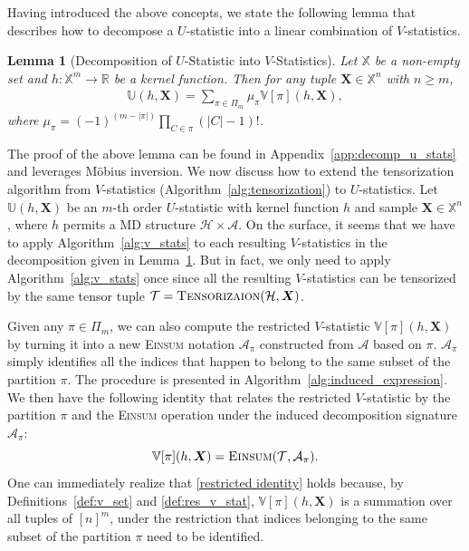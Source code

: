 \documentclass[sn-mathphys, natbib=false]{sn-jnl}
\theoremstyle{plain}
\newtheorem{lemma}{Lemma}
\theoremstyle{definition}
\def\Einsum{\textsc{Einsum}}
\newcommand{\mobius}{M\"obius}
\newcommand{\sPi}{\pi}
\newcommand{\ustat}{\mathbb{U}}
\newcommand{\vstat}{\mathbb{V}}
\newcommand{\ustatp}[2]{\ustat(#1,#2)}
\newcommand{\samplespace}{\bbX}
\newcommand{\partition}{\Pi}
\newcommand{\partitionp}[1]{\partition_{#1}}
\newcommand{\tensorcontraction}{\textsc{Einsum}}
\newcommand{\bbR}{{\mathbb{R}}}
\def\bbX{\mathbb{X}}
\def\calA{\mathcal{A}}
\def\calT{\mathcal{T}}
\def\calH{\mathcal{H}}
\begin{document}
\begin{bibunit}[agsm]
Having introduced the above concepts, we state the following lemma that describes how to decompose a $U$-statistic into a linear combination of $V$-statistics.

\begin{lemma}[Decomposition of $U$-Statistic into $V$-Statistics]
\label{lem:decomp_u_to_v}
Let $\bbX$ be a non-empty set and $h: \bbX^{m} \rightarrow \bbR$ be a kernel function. Then for any tuple $\bm{X} \in \bbX^{n}$ with $n \geq m$,
\begin{align*}
    \ustat(h,\bm{X}) = \sum_{\sPi \in \partitionp{m}} 
    \mu_\sPi \vstat[\sPi](h, \bm{X}), 
\end{align*}
where $\mu_\sPi = (-1)^{(m-|\sPi|)} \prod_{C \in \sPi} (|C| - 1)!$.
\end{lemma}

The proof of the above lemma can be found in Appendix~\ref{app:decomp_u_stats} and leverages \mobius{} inversion. We now discuss how to extend the tensorization algorithm from $V$-statistics (Algorithm~\ref{alg:tensorization}) to $U$-statistics. Let $\ustatp{h}{\bm{X}}$ be an $m$-th order $U$-statistic with kernel function $h$ and sample $\bm{X} \in \samplespace^n$, where $h$ permits a MD structure $\calH \times \calA$. On the surface, it seems that we have to apply Algorithm~\ref{alg:v_stats} to each resulting $V$-statistics in the decomposition given in Lemma~\ref{lem:decomp_u_to_v}. But in fact, we only need to apply Algorithm~\ref{alg:v_stats} once since all the resulting $V$-statistics can be tensorized by the same tensor tuple $\calT = \textsc{Tensorizaion} (\calH, \bm{X})$. 

Given any $\pi \in \partitionp{m}$, we can also compute the restricted $V$-statistic $\vstat[\pi] (h, \bm{X})$ by turning it into a new \Einsum{} notation $\calA_{\pi}$ constructed from $\calA$ based on $\pi$. $\calA_{\pi}$ simply identifies all the indices that happen to belong to the same subset of the partition $\pi$. The procedure is presented in Algorithm~\ref{alg:induced_expression}. We then have the following identity that relates the restricted $V$-statistic by the partition $\sPi$ and the \Einsum{} operation under the induced decomposition signature $\calA_{\pi}$:
\begin{equation}
\label{restricted identity}
\vstat[\sPi](h, \bm{X}) =  \tensorcontraction(\calT, \calA_\sPi).
\end{equation}
One can immediately realize that \eqref{restricted identity} holds because, by Definitions~\ref{def:v_set} and \ref{def:res_v_stat}, $\vstat[\pi](h, \bm{X})$ is a summation over all tuples of $[n]^m$, under the restriction that indices belonging to the same subset of the partition $\pi$ need to be identified.


\end{bibunit}
\end{document}
